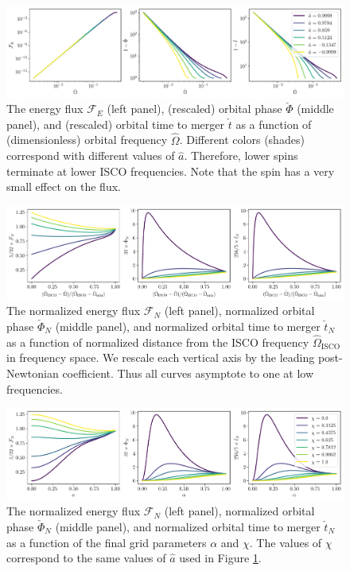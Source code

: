 \documentclass[%
 reprint,
 nofootinbib,
 amsmath,amssymb,
 aps,
 prd,
]{revtex4-2}
\begin{document}
\begin{figure}[!htp]
    \centering
    \includegraphics[width=0.95\linewidth]{figures/orginal_parametrization.pdf}
    \caption{The energy flux $\mathcal{F}_E$ (left panel), (rescaled) orbital phase $\check{\Phi}$ (middle panel), and (rescaled) orbital time to merger $\check{t}$ as a function of (dimensionless) orbital frequency $\hat{\Omega}$. Different colors (shades) correspond with different values of $\hat{a}$. Therefore, lower spins terminate at lower ISCO frequencies. Note that the spin has a very small effect on the flux.}
    \label{fig:original}
\end{figure}

\begin{figure}[!htp]
    \centering
    \includegraphics[width=0.98\linewidth]{figures/rescaled_parametrization.pdf}
    \caption{The normalized energy flux $\mathcal{F}_N$ (left panel), normalized orbital phase $\check{\Phi}_N$ (middle panel), and normalized orbital time to merger $\check{t}_N$ as a function of normalized distance from the ISCO frequency $\hat{\Omega}_\mathrm{ISCO}$ in frequency space. We rescale each vertical axis by the leading post-Newtonian coefficient. Thus all curves asymptote to one at low frequencies.}
    \label{fig:rescaled}
\end{figure}

\begin{figure}[!htp]
    \centering
    \includegraphics[width=0.98\linewidth]{figures/final_parametrization.pdf}
    \caption{The normalized energy flux $\mathcal{F}_N$ (left panel), normalized orbital phase $\check{\Phi}_N$ (middle panel), and normalized orbital time to merger $\check{t}_N$ as a function of the final grid parameters $\alpha$ and $\chi$. The values of $\chi$ correspond to the same values of $\hat{a}$ used in Figure \ref{fig:original}.}
    \label{fig:final}
\end{figure}
\end{document}
